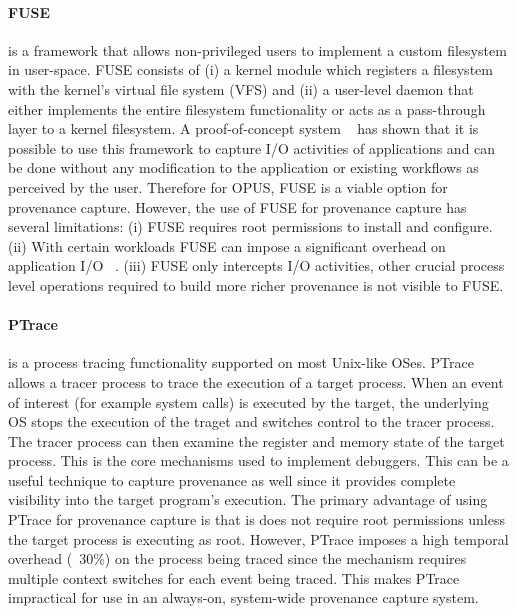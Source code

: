 \documentclass[withindex,glossary]{cam-thesis}
\begin{document}
\paragraph{FUSE} is a framework that allows non-privileged users to implement a custom filesystem in user-space. FUSE consists of (i) a kernel module which registers a filesystem with the kernel's virtual file system (VFS) and (ii) a user-level daemon that either implements the entire filesystem functionality or acts as a pass-through layer to a kernel filesystem. A proof-of-concept system ~\cite{StoryBook} has shown that it is possible to use this framework to capture I/O activities of applications and can be done without any modification to the application or existing workflows as perceived by the user. Therefore for OPUS, FUSE is a viable option for provenance capture. However, the use of FUSE for provenance capture has several limitations:
(i) FUSE requires root permissions to install and configure.
(ii) With certain workloads FUSE can impose a significant overhead on application I/O ~\cite{StoryBook}.
(iii) FUSE only intercepts I/O activities, other crucial process level operations required to build more richer provenance is not visible to FUSE.

\paragraph{PTrace} is a process tracing functionality supported on most Unix-like OSes. 
PTrace allows a tracer process to trace the execution of a target process.
When an event of interest (for example system calls) is executed by the target, the underlying OS stops the execution of the traget and switches control to the tracer process.
The tracer process can then examine the register and memory state of the target process.
This is the core mechanisms used to implement debuggers.
This can be a useful technique to capture provenance as well since it provides complete visibility into the target program's execution.
The primary advantage of using PTrace for provenance capture is that is does not require root permissions unless the target process is executing as root.
However, PTrace imposes a high temporal overhead (~30\%) on the process being traced since the mechanism requires multiple context switches for each event being traced.
This makes PTrace impractical for use in an always-on, system-wide provenance capture system.
\end{document}
